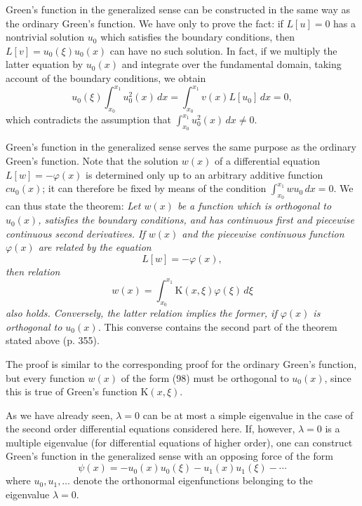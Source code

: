 Green's function in the generalized sense can be constructed in the same way as the ordinary Green's function. We have only to prove the fact: if $L[u]=0$ has a nontrivial solution $u_0$ which satisfies the boundary conditions, then $L[v]=u_0(\xi)u_0(x)$ can have no such solution. In fact, if we multiply the latter equation by $u_0(x)$ and integrate over the fundamental domain, taking account of the boundary conditions, we obtain
\[
u_0(\xi)\int_{x_0}^{x_1}u_0^2(x)\,dx
=\int_{x_0}^{x_1}v(x)L[u_0] \,dx=0,
\]
which contradicts the assumption that $\int_{x_0}^{x_1}u_0^2(x)\,dx\ne0$.

Green's function in the generalized sense serves the same purpose as the ordinary Green's function. Note that the solution $w(x)$ of a differential equation $L[w]=-\varphi(x)$ is determined only up to an arbitrary additive function $cu_0(x)$; it can therefore be fixed by means of the condition $\int_{x_0}^{x_1}wu_0\,dx=0$. We can thus state the theorem: \emph{Let $w(x)$ be a function which is orthogonal to $u_0(x)$, satisfies the boundary conditions, and has continuous first and piecewise continuous second derivatives. If $w(x)$ and the piecewise continuous function $\varphi(x)$ are related by the equation}
\[
L[w]=-\varphi(x),
\]
\emph{then relation}
\begin{equation}
w(x)=\int_{x_0}^{x_1}\mathrm K(x,\xi)\varphi(\xi)\,d\xi
\tag{98}
\end{equation}
\emph{also holds. Conversely, the latter relation implies the former, if $\varphi(x)$ is orthogonal to $u_0(x)$.} This converse contains the second part of the theorem stated above (p. 355).

The proof is similar to the corresponding proof for the ordinary Green's function, but every function $w(x)$ of the form (98) must be orthogonal to $u_0(x)$, since this is true of Green's function $\mathrm K(x,\xi)$.

As we have already seen, $\lambda=0$ can be at most a simple eigenvalue in the case of the second order differential equations considered here. If, however, $\lambda=0$ is a multiple eigenvalue (for differential equations of higher order), one can construct Green's function in the generalized sense with an opposing force of the form
\[
\psi(x)=-u_0(x)u_0(\xi)-u_1(x)u_1(\xi)-\cdots
\]
where $u_0,u_1,\ldots$ denote the orthonormal eigenfunctions belonging to the eigenvalue $\lambda=0$.

